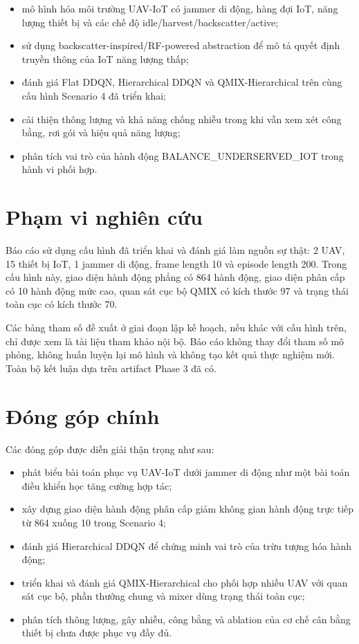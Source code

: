\begin{itemize}
  \item mô hình hóa môi trường UAV-IoT có jammer di động, hàng đợi IoT, năng lượng thiết bị và các chế độ idle/harvest/backscatter/active;
  \item sử dụng backscatter-inspired/RF-powered abstraction để mô tả quyết định truyền thông của IoT năng lượng thấp;
  \item đánh giá Flat DDQN, Hierarchical DDQN và QMIX-Hierarchical trên cùng cấu hình Scenario 4 đã triển khai;
  \item cải thiện thông lượng và khả năng chống nhiễu trong khi vẫn xem xét công bằng, rơi gói và hiệu quả năng lượng;
  \item phân tích vai trò của hành động BALANCE\_UNDERSERVED\_IOT trong hành vi phối hợp.
\end{itemize}

\section{Phạm vi nghiên cứu}

Báo cáo sử dụng cấu hình đã triển khai và đánh giá làm nguồn sự thật: 2 UAV, 15 thiết bị IoT, 1 jammer di động, frame length 10 và episode length 200. Trong cấu hình này, giao diện hành động phẳng có 864 hành động, giao diện phân cấp có 10 hành động mức cao, quan sát cục bộ QMIX có kích thước 97 và trạng thái toàn cục có kích thước 70.

Các bảng tham số đề xuất ở giai đoạn lập kế hoạch, nếu khác với cấu hình trên, chỉ được xem là tài liệu tham khảo nội bộ. Báo cáo không thay đổi tham số mô phỏng, không huấn luyện lại mô hình và không tạo kết quả thực nghiệm mới. Toàn bộ kết luận dựa trên artifact Phase 3 đã có.

\section{Đóng góp chính}

Các đóng góp được diễn giải thận trọng như sau:

\begin{itemize}
  \item phát biểu bài toán phục vụ UAV-IoT dưới jammer di động như một bài toán điều khiển học tăng cường hợp tác;
  \item xây dựng giao diện hành động phân cấp giảm không gian hành động trực tiếp từ 864 xuống 10 trong Scenario 4;
  \item đánh giá Hierarchical DDQN để chứng minh vai trò của trừu tượng hóa hành động;
  \item triển khai và đánh giá QMIX-Hierarchical cho phối hợp nhiều UAV với quan sát cục bộ, phần thưởng chung và mixer dùng trạng thái toàn cục;
  \item phân tích thông lượng, gây nhiễu, công bằng và ablation của cơ chế cân bằng thiết bị chưa được phục vụ đầy đủ.
\end{itemize}

